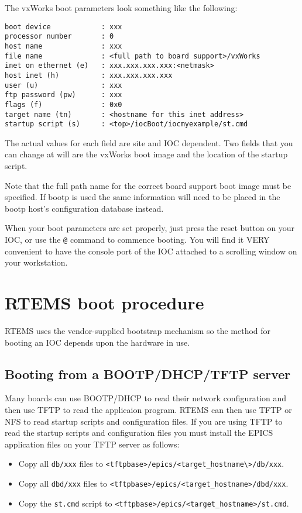 The vxWorks boot parameters look something like the following:

\begin{verbatim}
boot device            : xxx
processor number       : 0
host name              : xxx
file name              : <full path to board support>/vxWorks
inet on ethernet (e)   : xxx.xxx.xxx.xxx:<netmask>
host inet (h)          : xxx.xxx.xxx.xxx
user (u)               : xxx
ftp password (pw)      : xxx
flags (f)              : 0x0
target name (tn)       : <hostname for this inet address>
startup script (s)     : <top>/iocBoot/iocmyexample/st.cmd
\end{verbatim}
The actual values for each field are site and IOC dependent.
Two fields that you can change at will are the vxWorks boot image and the location of the startup script.

Note that the full path name for the correct board support boot image must be specified.
If bootp is used the same information will need to be placed in the bootp host's configuration database instead.

When your boot parameters are set properly, just press the reset button on your IOC, or use the \verb|@| command to commence booting.
You will find it VERY convenient to have the console port of the IOC attached to a scrolling window on your workstation.

\section{RTEMS boot procedure}

RTEMS uses the vendor-supplied bootstrap mechanism so the method for booting an IOC depends upon the hardware in use.

\subsection{Booting from a BOOTP/DHCP/TFTP server}

Many boards can use BOOTP/DHCP to read their network configuration and then use TFTP to read the applicaion program.
RTEMS can then use TFTP or NFS to read startup scripts and configuration files.
If you are using TFTP to read the startup scripts and configuration files you must install the EPICS application files on your TFTP server as follows:

\begin{itemize}
\item Copy all \verb|db/xxx| files to \verb|<tftpbase>/epics/<target_hostname\>/db/xxx|.

\item Copy all \verb|dbd/xxx| files to \verb|<tftpbase>/epics/<target_hostname>/dbd/xxx|.

\item Copy the \verb|st.cmd| script  to \verb|<tftpbase>/epics/<target_hostname>/st.cmd|.
\end{itemize}

